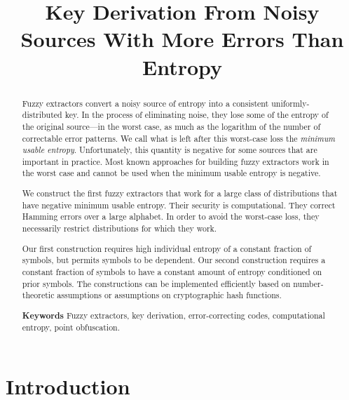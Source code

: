 \documentclass[11pt]{article}
\title{Key Derivation From Noisy Sources With More Errors Than Entropy}
\begin{document}
\maketitle


\begin{abstract}
Fuzzy extractors convert a noisy source of entropy into a consistent uniformly-distributed key.  In the process of eliminating noise, they  lose some of the entropy of the original source---in the worst case, as much as the logarithm of the number of correctable error patterns. We call what is left after this worst-case loss the \emph{minimum usable entropy}.  Unfortunately, this quantity is negative for some sources that are important in practice. Most known approaches for building fuzzy extractors work in the worst case and cannot be used when the minimum usable entropy is negative.

We construct the first fuzzy extractors that work for a large class of distributions that have negative minimum usable entropy. Their security is computational.  They correct Hamming errors over a large alphabet. In order to avoid the worst-case loss, they necessarily restrict distributions for which they work.  

Our first construction requires high individual entropy of a constant fraction of symbols, but permits symbols to be dependent.  Our second construction requires  a constant fraction of symbols to have a constant amount of entropy conditioned on prior symbols. The constructions can be implemented efficiently based on number-theoretic assumptions or assumptions on cryptographic hash functions.

\bigskip

\textbf{Keywords} Fuzzy extractors, key derivation, error-correcting codes, computational entropy, point obfuscation.
\end{abstract}


\section{Introduction}\label{sec:introduction}
\end{document}
